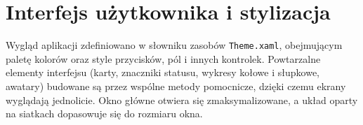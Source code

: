 \section{Interfejs użytkownika i stylizacja}
\label{sec:stylizacja}

Wygląd aplikacji zdefiniowano w słowniku zasobów \texttt{Theme.xaml}, obejmującym paletę kolorów oraz
style przycisków, pól i innych kontrolek. Powtarzalne elementy interfejsu (karty, znaczniki statusu,
wykresy kołowe i słupkowe, awatary) budowane są przez wspólne metody pomocnicze, dzięki czemu ekrany
wyglądają jednolicie. Okno główne otwiera się zmaksymalizowane, a układ oparty na siatkach dopasowuje
się do rozmiaru okna.
